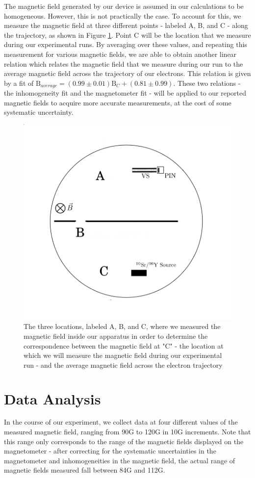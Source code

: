 The magnetic field generated by our device is assumed in our calculations to be homogeneous. However, this is not practically the case. To account for this, we measure the magnetic field at three different points - labeled A, B, and C - along the trajectory, as shown in Figure \ref{inhomo}. Point C will be the location that we measure during our experimental runs. By averaging over these values, and repeating this measurement for various magnetic fields, we are able to obtain another linear relation which relates the magnetic field that we measure during our run to the average magnetic field across the trajectory of our electrons. This relation is given by a fit of $\text{B}_{average} = (0.99 \pm 0.01) \text{B}_C + (0.81 \pm 0.99)$. These two relations - the inhomogeneity fit and the magnetometer fit - will be applied to our reported magnetic fields to acquire more accurate measurements, at the cost of some systematic uncertainty.
\begin{figure}[h]
  \includegraphics[width=.5\textwidth]{inhomo.png}
  \caption{The three locations, labeled A, B, and C, where we measured the magnetic field inside our apparatus in order to determine the correspondence between the magnetic field at "C" - the location at which we will measure the magnetic field during our experimental run - and the average magnetic field across the electron trajectory}
  \label{inhomo}
\end{figure}
\section{Data Analysis}
In the course of our experiment, we collect data at four different values of the measured magnetic field, ranging from 90G to 120G in 10G increments. Note that this range only corresponds to the range of the magnetic fields displayed on the magnetometer - after correcting for the systematic uncertainties in the magnetometer and inhomogeneities in the magnetic field, the actual range of magnetic fields measured fall between 84G and 112G.

